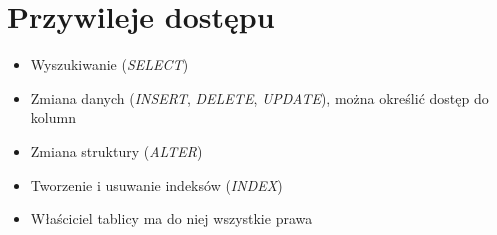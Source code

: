\documentclass[a4paper,twoside]{article}
\begin{document}
  	\section*{Przywileje dostępu}
  	\begin{itemize}
  		\item Wyszukiwanie (\emph{SELECT}) 
  		\item Zmiana danych (\emph{INSERT}, \emph{DELETE}, \emph{UPDATE}), można określić dostęp do kolumn 
  		\item Zmiana struktury (\emph{ALTER}) 
  		\item Tworzenie i usuwanie indeksów (\emph{INDEX})
  		\item Właściciel tablicy ma do niej wszystkie prawa
  	\end{itemize}
  	
\end{document}
